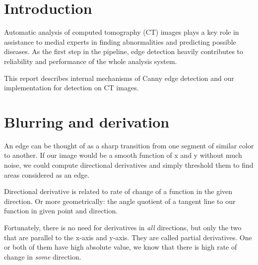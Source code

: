\documentclass[fleqn,moreauthors,10pt]{ds_report}
\affiliation{\textsuperscript{1}\textit{ae4664@student.uni-lj.si, 63160011}}
\begin{document}
\flushbottom

\maketitle

\thispagestyle{empty}


\section*{Introduction}
	
Automatic analysis of computed tomography (CT) images plays a key role in assistance to medial experts in finding abnormalities and predicting possible diseases. As the first step in the pipeline, edge detection heavily contributes to reliability and performance of the whole analysis system.

This report describes internal mechanisms of Canny edge detection and our implementation for detection on CT images.


\section*{Blurring and derivation}

An edge can be thought of as a sharp transition from one segment of similar color to another. If our image would be a smooth function of x and y without much noise, we could compute directional derivatives and simply threshold them to find areas considered as an edge.

Directional derivative is related to rate of change of a function in the given direction. Or more geometrically: the angle quotient of a tangent line to our function in given point and direction.

Fortunately, there is no need for derivatives in \textit{all} directions, but only the two that are parallel to the x-axis and y-axis. They are called partial derivatives. One or both of them have high absolute value, we know that there is high rate of change in \textit{some} direction.
\end{document}
